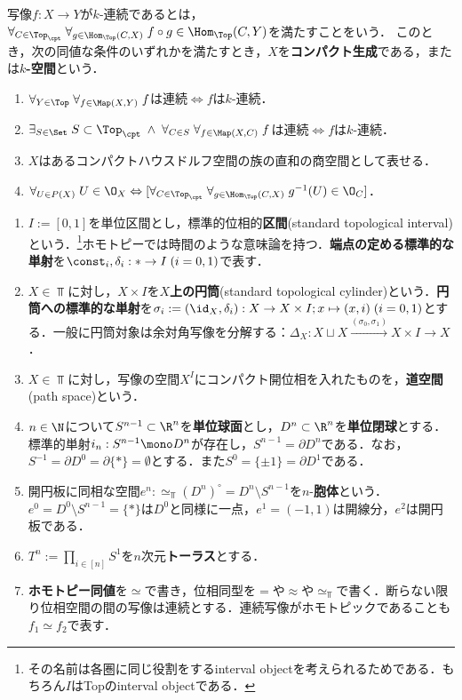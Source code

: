 \documentclass[uplatex, dvipdfmx]{jsreport}
\begin{document}
\begin{definition}
    写像$f:X\to Y$が$k$-連続であるとは，$\forall_{C\in\Top_\cpt}\;\forall_{g\in\Hom_\Top(C,X)}\;f\circ g\in\Hom_\Top(C,Y)$を満たすことをいう．
    このとき，次の同値な条件のいずれかを満たすとき，$X$を\textbf{コンパクト生成}である，または\textbf{$k$-空間}という．
    \begin{enumerate}
        \item $\forall_{Y\in\Top}\;\forall_{f\in\Map(X,Y)}\;f$は連続$\Leftrightarrow f$は$k$-連続．
        \item $\exists_{S\in\Set}\;S\subset\Top_\cpt\;\land\;\forall_{C\in S}\;\forall_{f\in\Map(X,C)}\;f$は連続$\Leftrightarrow f$は$k$-連続．
        \item $X$はあるコンパクトハウスドルフ空間の族の直和の商空間として表せる．
        \item $\forall_{U\in P(X)}\;U\in\O_X\Leftrightarrow[\forall_{C\in\Top_\cpt}\;\forall_{g\in\Hom_{\Top}(C,X)}\;g^{-1}(U)\in\O_C]$．
    \end{enumerate}
\end{definition}

\begin{notation}[基本的空間]\mbox{}
    \begin{enumerate}
        \item $I:=[0,1]$を単位区間とし，標準的位相的\textbf{区間}(standard topological interval)という．\footnote{その名前は各圏に同じ役割をするinterval objectを考えられるためである．もちろん$I$はTopのinterval objectである．}ホモトピーでは時間のような意味論を持つ．\textbf{端点の定める標準的な単射}を$\const_i,\delta_i:*\to I\;(i=0,1)$で表す．
        \item $X\in\Top$に対し，$X\times I$を\textbf{$X$上の円筒}(standard topological cylinder)という．\textbf{円筒への標準的な単射}を$\sigma_i:=(\id_X,\delta_i):X\to X\times I;x\mapsto (x,i)\;(i=0,1)$とする．一般に円筒対象は余対角写像を分解する：$\Delta_X:X\sqcup X\xrightarrow{(\sigma_0,\sigma_1)}X\times I\to X$．
        \item $X\in\Top$に対し，写像の空間$X^I$にコンパクト開位相を入れたものを，\textbf{道空間}(path space)という．
        \item $n\in\N$について$S^{n-1}\subset\R^n$を\textbf{単位球面}とし，$D^n\subset\R^n$を\textbf{単位閉球}とする．標準的単射$i_n:S^{n-1}\mono D^n$が存在し，$S^{n-1}=\partial D^n$である．なお，$S^{-1}=\partial D^0=\partial\{*\}=\emptyset$とする．また$S^0=\{\pm 1\}=\partial D^1$である．
        \item 開円板に同相な空間$e^n:\simeq_{\Top}(D^n)^\circ=D^n\setminus S^{n-1}$を$n$-\textbf{胞体}という．$e^0=D^0\setminus S^{n-1}=\{*\}$は$D^0$と同様に一点，$e^1=(-1,1)$は開線分，$e^2$は開円板である．
        \item $T^n:=\prod_{i\in[n]}S^1$を$n$次元\textbf{トーラス}とする．
        \item \textbf{ホモトピー同値}を$\simeq$で書き，位相同型を$=$や$\approx$や$\simeq_\Top$で書く．断らない限り位相空間の間の写像は連続とする．連続写像がホモトピックであることも$f_1\simeq f_2$で表す．
    \end{enumerate}
\end{notation}
\end{document}
